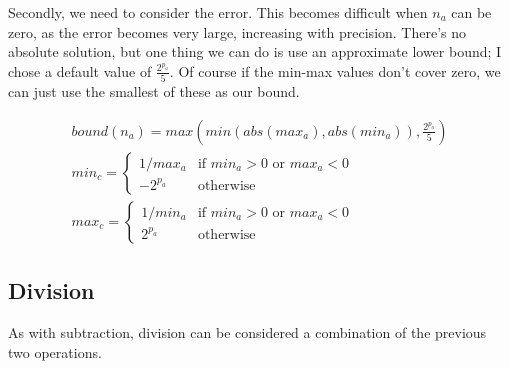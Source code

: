 \documentclass[10pt,a4paper]{article}
\numberwithin{equation}{section}
\numberwithin{equation}{subsection}
\begin{document}
	Secondly, we need to consider the error. This becomes difficult when $n_a$ can be zero, as the error becomes very large, increasing with precision. There's no absolute solution, but one thing we can do is use an approximate lower bound; I chose a default value of $\frac{2^{p_a}}{5}$. Of course if the min-max values don't cover zero, we can just use the smallest of these as our bound.
	
	\begin{eqnarray}
		bound(n_a) = max\left(min(abs(max_a),abs(min_a)), \frac{2^{p_a}}{5}\right) \\
		min_c = \begin{cases}
			1/max_a & \text{if } min_a > 0 \text{ or } max_a < 0 \\
			-2^{p_a} & \text{otherwise}
		\end{cases} \\
		max_c = \begin{cases}
			1/min_a & \text{if } min_a > 0 \text{ or } max_a < 0 \\
			2^{p_a} & \text{otherwise}
		\end{cases}
	\end{eqnarray}
	
	\subsection{Division}
	
	As with subtraction, division can be considered a combination of the previous two operations.
	
	
	
\end{document}
